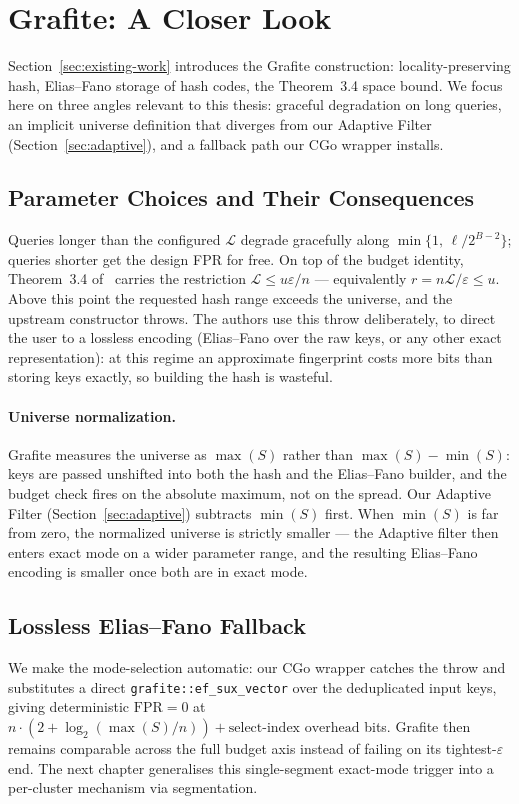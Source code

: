 \section{Grafite: A Closer Look}
\label{sec:grafite-deep-dive}

Section~\ref{sec:existing-work} introduces the Grafite construction:
locality-preserving hash, Elias--Fano storage of hash codes, the
Theorem~3.4 space bound. We focus here on three angles relevant to
this thesis: graceful degradation on long queries, an implicit
universe definition that diverges from our Adaptive Filter
(Section~\ref{sec:adaptive}), and a fallback path our CGo wrapper
installs.

\subsection{Parameter Choices and Their Consequences}
\label{subsec:grafite-params}

Queries longer than the configured $\mathcal{L}$ degrade gracefully
along $\min\{1,\,\ell/2^{B-2}\}$; queries shorter get the design FPR
for free. On top of the budget identity, Theorem~3.4
of~\citep{grafite2024} carries the restriction
$\mathcal{L} \leq u\varepsilon/n$ --- equivalently
$r = n\mathcal{L}/\varepsilon \leq u$. Above this point the requested
hash range exceeds the universe, and the upstream constructor throws.
The authors use this throw deliberately, to direct the user to a
lossless encoding (Elias--Fano over the raw keys, or any other exact
representation): at this regime an approximate fingerprint costs more
bits than storing keys exactly, so building the hash is wasteful.

\paragraph{Universe normalization.}
Grafite measures the universe as $\max(S)$ rather than
$\max(S) - \min(S)$: keys are passed unshifted into both the hash and
the Elias--Fano builder, and the budget check fires on the absolute
maximum, not on the spread. Our Adaptive Filter
(Section~\ref{sec:adaptive}) subtracts $\min(S)$ first. When $\min(S)$
is far from zero, the normalized universe is strictly smaller --- the
Adaptive filter then enters exact mode on a wider parameter range,
and the resulting Elias--Fano encoding is smaller once both are in
exact mode.

\subsection{Lossless Elias--Fano Fallback}
\label{subsec:grafite-fallback}

We make the mode-selection automatic: our CGo wrapper catches the
throw and substitutes a direct \texttt{grafite::ef\_sux\_vector} over
the deduplicated input keys, giving deterministic $\mathrm{FPR} = 0$
at $n \cdot (2 + \log_2(\max(S)/n)) + \text{select-index overhead}$
bits. Grafite then remains comparable across the full budget axis
instead of failing on its tightest-$\varepsilon$ end. The next chapter
generalises this single-segment exact-mode trigger into a per-cluster
mechanism via segmentation.

